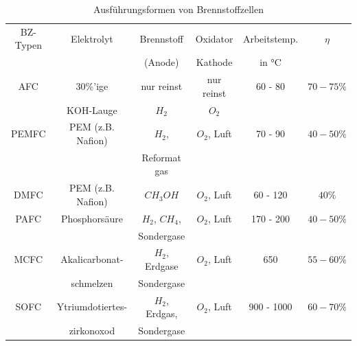 \begin{table}[H]
    \caption{Ausführungsformen von Brennstoffzellen}
    \centering
        \begin{tabular}[pos]{|c|c|c|c|c|c|}
            \hline
            \rowcolor[HTML]{70AD47} 
            BZ-Typen    & Elektrolyt                        & Brennstoff                        & Oxidator                  & Arbeitstemp.          & $\eta$            \\
            \rowcolor[HTML]{70AD47} 
                        &                                   & (Anode)                           & Kathode                   & in °C                 &                   \\\hline\hline
            AFC         & 30\%'ige                          & nur reinst                        & nur reinst                & 60 - 80               & $70 - 75\%$       \\
                        & KOH-Lauge                         & $H_2$                             & $O_2$                     &                       &                   \\\hline
            PEMFC       & PEM (z.B. Nafion)                 & $H_2$,                            & $O_2$, Luft               & 70 - 90               & $40 - 50\%$       \\
                        &                                   & Reformat gas                      &                           &                       &                   \\\hline
            DMFC        & PEM (z.B. Nafion)                 & $CH_3OH$                          & $O_2$, Luft               & 60 - 120              & $40\%$            \\\hline
            PAFC        & Phosphorsäure                     & $H_2$, $CH_4$,                    & $O_2$, Luft               & 170 - 200             & $40 - 50\%$       \\
                        &                                   & Sondergase                        &                           &                       &                   \\\hline
            MCFC        & Akalicarbonat-                    & $H_2$, Erdgase                    & $O_2$, Luft               & 650                   & $55 - 60\%$       \\
                        & schmelzen                         & Sondergase                        &                           &                       &                   \\\hline
            SOFC        & Ytriumdotiertes-                  & $H_2$, Erdgas,                    & $O_2$, Luft               & 900 - 1000            & $60 - 70\%$       \\
                        & zirkonoxod                        & Sondergase                        &                           &                       &                   \\\hline
        \end{tabular}
        \label{tab:20230618_BZ-arten}
\end{table}

